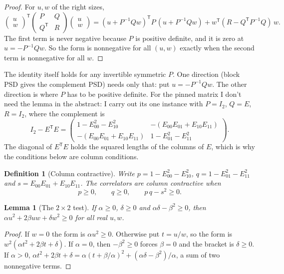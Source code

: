 \documentclass[11pt,twoside]{article}
\theoremstyle{thielethm}
\newtheorem{lemma}[theorem]{Lemma}
\theoremstyle{thieledef}
\newtheorem{definition}{Definition}[section]
\theoremstyle{thieledef}
\theoremstyle{thieledef}
\theoremstyle{thielethm}
\theoremstyle{thieleobs}
\theoremstyle{thielethm}
\begin{document}
\begin{proof}
For $u, w$ of the right sizes,
\[
\begin{pmatrix} u \\ w \end{pmatrix}^{\!\mathsf T}
\begin{pmatrix} P & Q \\ Q^{\mathsf T} & R \end{pmatrix}
\begin{pmatrix} u \\ w \end{pmatrix}
= (u + P^{-1} Q w)^{\mathsf T} P \,(u + P^{-1} Q w)
+ w^{\mathsf T} (R - Q^{\mathsf T} P^{-1} Q)\, w.
\]
The first term is never negative because $P$ is positive definite, and it is zero at
$u = -P^{-1} Q w$. So the form is nonnegative for all $(u, w)$ exactly when the second term
is nonnegative for all $w$.
\end{proof}

The identity itself holds for any invertible symmetric $P$. One direction (block PSD gives the
complement PSD) needs only that: put $u = -P^{-1}Qw$. The other direction is where $P$ has to be
positive definite. For the pinned matrix I don't need the lemma in the abstract: I carry out its one instance with
$P = I_2$, $Q = E$, $R = I_2$, where the complement is
\[
I_2 - E^{\mathsf T} E =
\begin{pmatrix}
1 - E_{00}^2 - E_{10}^2 & -(E_{00} E_{01} + E_{10} E_{11}) \\
-(E_{00} E_{01} + E_{10} E_{11}) & 1 - E_{01}^2 - E_{11}^2
\end{pmatrix}.
\]
The diagonal of $E^{\mathsf T} E$ holds the squared lengths of the columns of $E$, which is
why the conditions below are column conditions.

\begin{definition}[Column contractive]
Write
$p = 1 - E_{00}^2 - E_{10}^2$, $q = 1 - E_{01}^2 - E_{11}^2$ and
$s = E_{00} E_{01} + E_{10} E_{11}$. The correlators are column contractive when
\[
p \ge 0, \qquad q \ge 0, \qquad p\,q - s^2 \ge 0.
\]
\end{definition}

\begin{lemma}[The $2\times2$ test]\label{lem:chsh-psd2}
If $\alpha \ge 0$, $\delta \ge 0$ and
$\alpha\delta - \beta^2 \ge 0$, then $\alpha u^2 + 2\beta u w + \delta w^2 \ge 0$ for all real
$u, w$.
\end{lemma}

\begin{proof}
If $w = 0$ the form is $\alpha u^2 \ge 0$. Otherwise put $t = u/w$, so the form is
$w^2(\alpha t^2 + 2\beta t + \delta)$. If $\alpha = 0$, then $-\beta^2 \ge 0$ forces
$\beta = 0$ and the bracket is $\delta \ge 0$. If $\alpha > 0$,
$\alpha t^2 + 2\beta t + \delta = \alpha (t + \beta/\alpha)^2 + (\alpha\delta - \beta^2)/\alpha$,
a sum of two nonnegative terms.
\end{proof}
\end{document}
